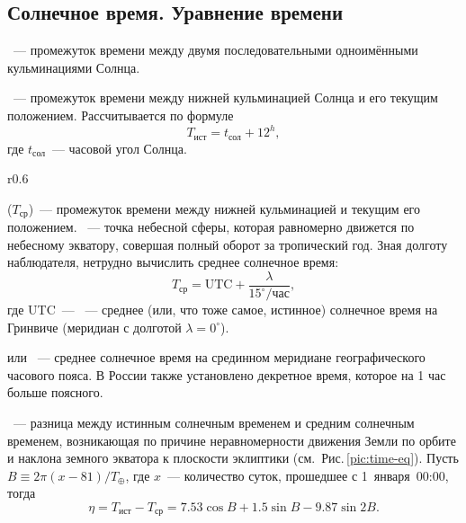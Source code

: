 \subsection{Солнечное время. Уравнение времени}
~--- промежуток времени между двумя последовательными одноимёнными кульминациями Солнца.

~--- промежуток времени между нижней кульминацией Солнца и его текущим положением. Рассчитывается по формуле
\begin{equation}
	T_{\text{ист}} = t_{\text{сол}}+12^h,
\end{equation}
где $t_{\text{сол}}$~--- часовой угол Солнца.

\begin{wrapfigure}[14]{r}{0.6\tw}
	\centering
	\caption{График уравнения времени}
	\label{pic:time-eq}
\end{wrapfigure}
 ($T_\text{ср}$)~--- промежуток времени между нижней кульминацией  и текущим его положением. ~--- точка небесной сферы, которая равномерно движется по небесному экватору, совершая полный оборот за тропический год. Зная долготу наблюдателя, нетрудно вычислить среднее солнечное время:
\begin{equation*}
	T_\text{ср} = \text{UTC} + \frac{\lambda}{15^\circ/\text{час}},
\end{equation*}
где UTC~--- ~--- среднее (или, что тоже самое, истинное) солнечное время на Гринвиче (меридиан с долготой $\lambda = 0^\circ$).

 или ~--- среднее солнечное время на срединном меридиане географического часового пояса. В России также установлено декретное время, которое на 1 час больше поясного.

~--- разница между истинным солнечным временем и средним солнечным временем, возникающая по причине неравномерности движения Земли по орбите и наклона земного экватора к плоскости эклиптики (см.~Рис.\,\ref{pic:time-eq}). Пусть $B \equiv 2 \pi (x - 81)/T_\oplus$, где $x$~--- количество суток, прошедшее с 1~января~00:00, тогда
\begin{equation}
	\eta = T_{\text{ист}} - T_\text{ср} = 7.53 \cos B + 1.5 \sin B - 9.87 \sin 2 B.
\end{equation}
